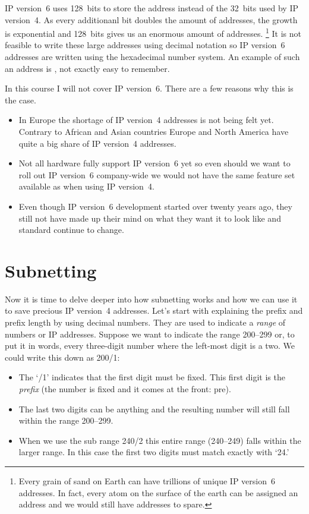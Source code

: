 \acs{IP} version~6 uses 128~bits to store the address instead of the 32~bits used by \acs{IP} version~4.
As every additionanl bit doubles the amount of addresses, the growth is exponential and 128~bits gives us an enormous amount of addresses.%
   \footnote{%
      Every grain of sand on Earth can have trillions of unique \acs{IP} version~6 addresses.
      In fact, every atom on the surface of the earth can be assigned an address and we would still have addresses to spare.
   }
It is not feasible to write these large addresses using decimal notation so \acs{IP} version~6 addresses are written using the hexadecimal number system.
An example of such an address is , not exactly easy to remember.

In this course I will not cover \acs{IP} version~6.
There are a few reasons why this is the case.
\begin{itemize}
\item
   In Europe the shortage of \acs{IP} version~4 addresses is not being felt yet.
   Contrary to African and Asian countries Europe and North America have quite a big share of \acs{IP} version~4 addresses.
\item
   Not all hardware fully support \acs{IP} version~6 yet so even should we want to roll out \acs{IP} version~6 company-wide we would not have the same feature set available as when using \acs{IP} version~4.
\item
   Even though \acs{IP} version~6 development started over twenty years ago, they still not have made up their mind on what they want it to look like and standard continue to change.
\end{itemize}



\section{Subnetting}
\label{sec:ip-subnetting}

Now it is time to delve deeper into how subnetting works and how we can use it to save precious \acs{IP} version~4 addresses.
Let's start with explaining the prefix and prefix length by using decimal numbers.
They are used to indicate a \emph{range} of numbers or \acs{IP} addresses.
Suppose we want to indicate the range 200--299 or, to put it in words, every three-digit number where the left-most digit is a two.
We could write this down as 200/1:
\begin{itemize}
\item
   The `/1' indicates that the first digit must be fixed.
   This first digit is the \emph{prefix} (the number is fixed and it comes at the front: pre).
\item
   The last two digits can be anything and the resulting number will still fall within the range 200--299.
\item
   When we use the sub range 240/2 this entire range (240--249) falls within the larger range.
   In this case the first two digits must match exactly with `24.'
\end{itemize}

